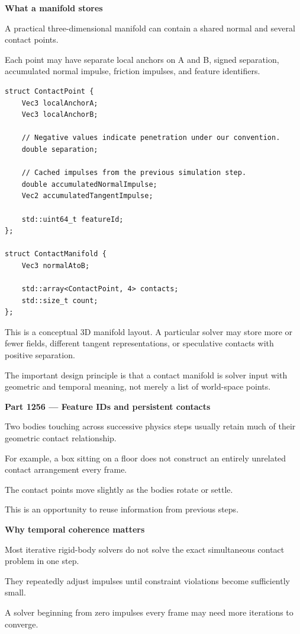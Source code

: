 \textbf{What a manifold stores}

A practical three-dimensional manifold can contain a shared normal and several contact points.

Each point may have separate local anchors on A and B, signed separation, accumulated normal impulse, friction impulses, and feature identifiers.

\begin{verbatim}
struct ContactPoint {
    Vec3 localAnchorA;
    Vec3 localAnchorB;

    // Negative values indicate penetration under our convention.
    double separation;

    // Cached impulses from the previous simulation step.
    double accumulatedNormalImpulse;
    Vec2 accumulatedTangentImpulse;

    std::uint64_t featureId;
};

struct ContactManifold {
    Vec3 normalAtoB;

    std::array<ContactPoint, 4> contacts;
    std::size_t count;
};
\end{verbatim}

This is a conceptual 3D manifold layout. A particular solver may store more or fewer fields, different tangent representations, or speculative contacts with positive separation.

The important design principle is that a contact manifold is solver input with geometric and temporal meaning, not merely a list of world-space points.

\textbf{Part 1256 --- Feature IDs and persistent contacts}

Two bodies touching across successive physics steps usually retain much of their geometric contact relationship.

For example, a box sitting on a floor does not construct an entirely unrelated contact arrangement every frame.

The contact points move slightly as the bodies rotate or settle.

This is an opportunity to reuse information from previous steps.

\textbf{Why temporal coherence matters}

Most iterative rigid-body solvers do not solve the exact simultaneous contact problem in one step.

They repeatedly adjust impulses until constraint violations become sufficiently small.

A solver beginning from zero impulses every frame may need more iterations to converge.

